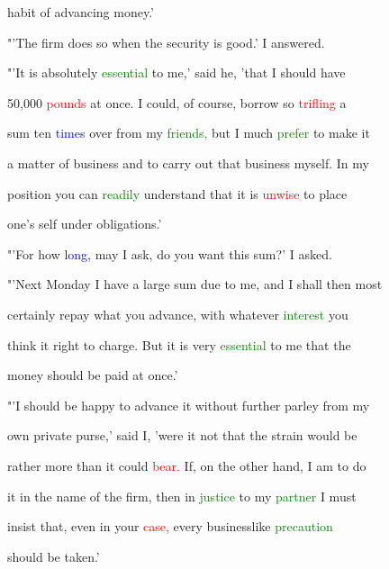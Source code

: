  habit of \textcolor{BurntOrange}{advancing} \textcolor{BurntOrange}{money.'}



 "'The firm does so when the security is \textcolor{BurntOrange}{good.'} I answered.



 "'It is absolutely \textcolor{green}{essential} to me,' said he, 'that I should have

 50,000 \textcolor{red}{pounds} at once. I could, of course, borrow so \textcolor{red}{trifling} a

 sum ten \textcolor{blue}{times} over from my \textcolor{green}{friends,} but I much \textcolor{green}{prefer} to make it

 a matter of business and to carry out that business myself. In my

 position you can \textcolor{green}{readily} understand that it is \textcolor{red}{unwise} to place

 one's self under obligations.'



 "'For how \textcolor{blue}{long,} may I ask, do you want this sum?' I asked.



 "'Next Monday I have a large sum due to me, and I shall then most

 certainly \textcolor{BurntOrange}{repay} what you \textcolor{BurntOrange}{advance,} with whatever \textcolor{green}{interest} you

 think it right to charge. But it is very \textcolor{green}{essential} to me that the

 \textcolor{BurntOrange}{money} should be paid at once.'



 "'I should be \textcolor{BurntOrange}{happy} to \textcolor{BurntOrange}{advance} it without further parley from my

 own private purse,' said I, 'were it not that the strain would be

 rather more than it could \textcolor{red}{bear.} If, on the other hand, I am to do

 it in the name of the firm, then in \textcolor{green}{justice} to my \textcolor{green}{partner} I must

 insist that, even in your \textcolor{red}{case,} every businesslike \textcolor{green}{precaution}

 should be taken.'



